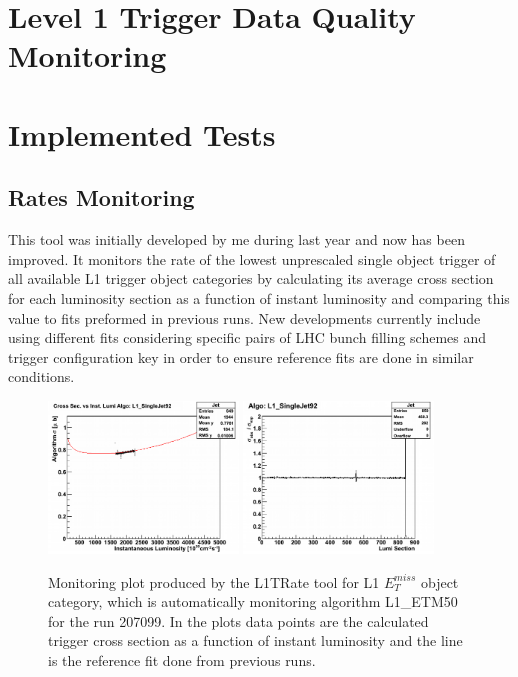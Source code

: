 \section{Level 1 Trigger Data Quality Monitoring}

\section{Implemented Tests}

\subsection{Rates Monitoring}

This tool was initially developed by me during last year and now has been improved. It monitors the rate of the
lowest unprescaled single object trigger of all available L1 trigger object categories by calculating its
average cross section for each luminosity section as a function of instant luminosity and comparing this value to
fits preformed in previous runs. New developments currently include using different fits considering specific pairs of
LHC bunch filling schemes and trigger configuration key in order to ensure reference fits are done in similar conditions.

\begin{figure}[!htb]
\centering
\includegraphics[width=0.45\textwidth]{Chapter03/L1TOnline/Images/Run177878_Jet_CrossSection.png}
\includegraphics[width=0.45\textwidth]{Chapter03/L1TOnline/Images/Run177878_Jet_RateCertification.png}
\caption{Monitoring plot produced by the L1TRate tool for L1 $E_T^{miss}$ object category, which is automatically
monitoring algorithm L1\_ETM50 for the run 207099. In the plots data points are the calculated trigger cross
section as a function of instant luminosity and the line is the reference fit done from previous runs.}
\label{figure_ServiceWork_L1TRate}
\end{figure}

